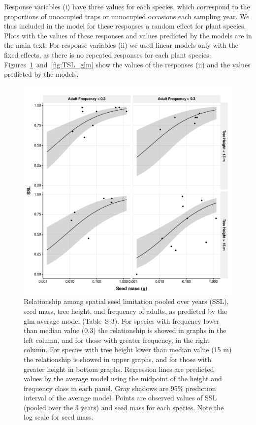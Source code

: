 \documentclass{article}
\begin{document}
Response variables (i) have three values for each species, which
correspond to the proportions of unoccupied traps or unnocupied
occasions each sampling year. We thus included in the model for these
responses a random effect for plant species. Plots with the values of
these responses and values predicted by the models are in the main
text. For response variables (ii) we used linear models only with the fixed
effects, as there is no repeated responses for each plant species.
Figures~\ref{fig:SSL_glm}~and~\ref{fig:TSL_glm} show the values of the responses
(ii) and the values predicted by the models. 

\FloatBarrier









\begin{figure}[h!]
  \centering
  \includegraphics[width=\textwidth]{../figures/SSL_all_pred_prob_glm}
  \caption{Relationship among spatial seed limitation pooled over
    years (SSL), seed mass, tree height, and frequency of adults, as
    predicted by the glm average model (Table~S-3). For species with
    frequency lower than median value (0.3) the relationship is showed
    in graphs in the left column, and for those with greater
    frequency, in the right column. For species with tree height lower
    than median value (15 m) the relationship is showed in upper
    graphs, and for those with greater height in bottom
    graphs. Regression lines are predicted values by the average model
    using the midpoint of the height and frequency class in each
    panel. Gray shadows are 95\% prediction interval of the average
    model. Points are observed values of SSL (pooled over the 3 years)
    and seed mass for each species. Note the log scale for seed mass.}
  \label{fig:SSL_glm}
\end{figure}
\end{document}
